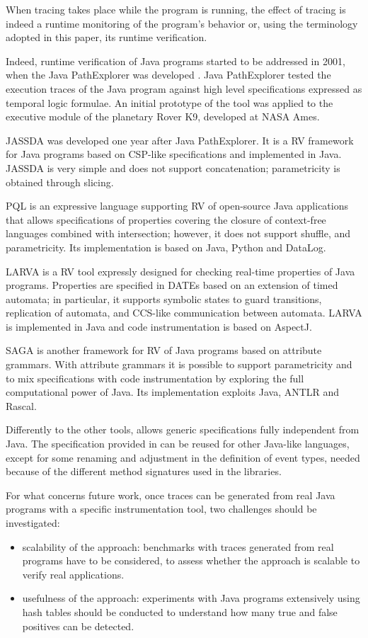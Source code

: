 When tracing takes place while the program is running, the effect of tracing is indeed a runtime monitoring of the program's behavior or, using the terminology adopted in this paper, its runtime verification.

Indeed, runtime verification of Java programs started to be addressed in 2001, when the Java PathExplorer was developed \cite{havelund2001java}. Java PathExplorer tested the execution traces of the Java program against high level specifications expressed as temporal logic formulae. An initial prototype of the tool was applied to the executive module of the planetary Rover K9, developed at NASA Ames. 

JASSDA \cite{BrorkensM02} was developed one year after Java PathExplorer. It is a RV framework for Java programs
based on CSP-like specifications and implemented in Java. JASSDA is very simple and does not support concatenation; parametricity
is obtained through slicing. 

PQL \cite{MartinLL05}  is an expressive language supporting RV of open-source Java
applications that allows specifications of properties covering the closure of context-free languages combined with intersection;
however, it does not support shuffle, and parametricity.  Its implementation is based on Java, Python and DataLog. 


LARVA \cite{ColomboPS09} is a RV tool expressly designed for checking real-time properties of Java programs.
Properties are specified in DATEs \cite{DATEs}
based on an extension of timed automata; in particular, it supports
symbolic states to guard transitions, replication of automata, and 
CCS-like communication between automata. LARVA is implemented in Java and code instrumentation is based on AspectJ.

SAGA  \cite{BoerGouw14} is another framework for RV of Java programs
based on attribute grammars. With attribute grammars it is possible to support parametricity and to mix specifications
with code instrumentation by exploring the full computational power of Java. Its implementation exploits Java, ANTLR and Rascal.

Differently to the other tools, \rml allows generic specifications fully independent from Java.
The specification provided in  can be reused for other Java-like languages, except for some renaming and adjustment
in the definition of event types, needed because of the different method signatures used in the libraries.

For what concerns future work, once traces can be generated from real Java programs with a specific instrumentation tool,
two challenges should be investigated:
\begin{itemize}
\item scalability of the approach: benchmarks with traces generated from real programs have to be considered, to assess whether
  the approach is scalable to verify real applications.
\item usefulness of the approach: experiments with Java programs extensively using hash tables should be conducted to understand
  how many true and false positives can be detected.
\end{itemize}

